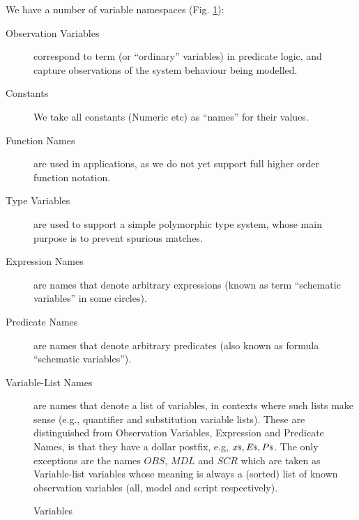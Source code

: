We have a number of variable namespaces (Fig. \ref{fig:UTP2:variables}):
\begin{description}
  \item[Observation Variables]
    correspond to term (or ``ordinary'' variables) in predicate logic,
    and capture observations of the system behaviour being modelled.
  \item[Constants]
    We take all constants (Numeric etc) as ``names'' for their values.
  \item[Function Names]
   are used in applications, as we do not yet support full higher order
   function notation.
  \item[Type Variables]
   are used to support a simple polymorphic type system,
   whose main purpose is to prevent spurious matches.
  \item[Expression Names]
   are names that denote arbitrary expressions
   (known as term ``schematic variables'' in some circles).
  \item[Predicate Names]
   are names that denote arbitrary predicates
   (also known as formula ``schematic variables'').
  \item[Variable-List Names]
   are names that denote a list of variables,
   in contexts where such lists make sense 
   (e.g., quantifier and substitution variable lists).
   These are distinguished from Observation Variables, Expression and Predicate
   Names, is that they have a dollar postfix, e.g, ${x}{\scriptstyle\$}, {E}{\scriptstyle\$}, {P}{\scriptstyle\$}$.
   The only exceptions are the names $OBS$, $MDL$ and $SCR$ which are taken as
   Variable-list variables whose meaning is always a (sorted) list of
   known observation variables (all, model and script respectively).
\end{description}

\begin{figure}
  \framebox{\VARMATHSYNTAX}
  \caption{ Variables}
  \label{fig:UTP2:variables}
\end{figure}

